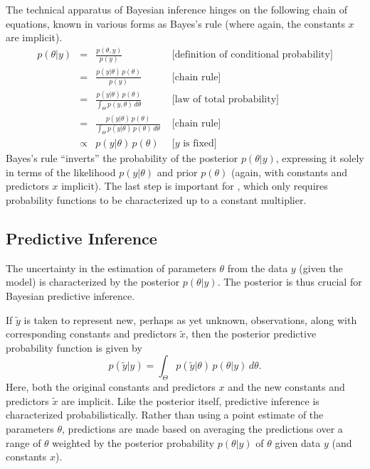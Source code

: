 The technical apparatus of Bayesian inference hinges on the following
chain of equations, known in various forms as Bayes's rule (where
again, the constants $x$ are implicit).
%
\[
\begin{array}{rcll}
p(\theta|y)  & =  & \displaystyle \frac{p(\theta,y)}{p(y)} 
& \mbox{{} \ \ \ \ \ [definition of  conditional probability]}
\\[16pt]
& = & \displaystyle \frac{p(y|\theta) \, p(\theta)}{p(y)}
& \mbox{{} \ \ \ \ \ [chain rule]}
\\[16pt]
& = & \displaystyle \frac{p(y|\theta) \, p(\theta)}
                        {\int_{\Theta} p(y,\theta) \, d\theta}
& \mbox{{} \ \ \ \ \ [law of total probability]}
\\[16pt]
& = & \displaystyle \frac{p(y|\theta) \, p(\theta)}
                        {\int_{\Theta} p(y|\theta) \, p(\theta) \, d\theta}
& \mbox{{} \ \ \ \ \ [chain rule]}
\\[16pt]
& \propto & \displaystyle p(y|\theta) \, p(\theta)
& \mbox{{} \ \ \ \ \ [$y$ is fixed]}
\end{array}
\]
%
Bayes's rule ``inverts'' the probability of the posterior
$p(\theta|y)$, expressing it solely in terms of the likelihood
$p(y|\theta)$ and prior $p(\theta)$ (again, with constants and
predictors $x$ implicit).  The last step is important for \Stan, which
only requires probability functions to be characterized up to a
constant multiplier.

\subsection{Predictive Inference}

The uncertainty in the estimation of parameters $\theta$ from the data
$y$ (given the model) is characterized by the posterior $p(\theta|y)$.
The posterior is thus crucial for Bayesian predictive inference.

If $\tilde{y}$ is taken to represent new, perhaps as yet unknown,
observations, along with corresponding constants and predictors
$\tilde{x}$, then the posterior predictive probability function is
given by
%
\[
p(\tilde{y}|y)
= \int_{\Theta} p(\tilde{y}|\theta) 
                \, p(\theta|y) \, d\theta.
\]
Here, both the original constants and predictors $x$ and the new
constants and predictors $\tilde{x}$ are implicit.  Like the posterior
itself, predictive inference is characterized probabilistically.
Rather than using a point estimate of the parameters $\theta$,
predictions are made based on averaging the predictions over a range
of $\theta$ weighted by the posterior probability $p(\theta|y)$ of
$\theta$ given data $y$ (and constants $x$).

